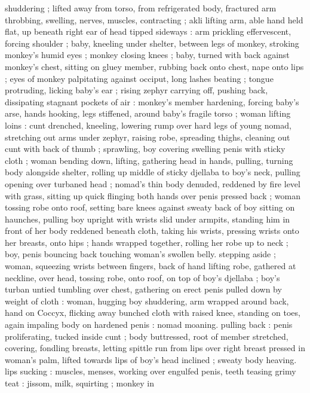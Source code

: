 shuddering ; lifted away from torso, from refrigerated body, fractured 
arm throbbing, swelling, nerves, muscles, contracting ; akli lifting 
arm, able hand held flat, up beneath right ear of head tipped 
sideways : arm prickling effervescent, forcing shoulder ; baby, 
kneeling under shelter, between legs of monkey, stroking monkey's 
humid eyes ; monkey closing knees ; baby, turned with back against 
monkey's chest, sitting on gluey member, rubbing back onto chest, 
nape onto lips ; eyes of monkey palpitating against occiput, long 
lashes beating ; tongue protruding, licking baby's ear ; rising zephyr 
carrying off, pushing back, dissipating stagnant pockets of air : 
monkey's member hardening, forcing baby's arse, hands hooking, 
legs stiffened, around baby's fragile torso ; woman lifting loins : cunt 
drenched, kneeling, lowering rump over hard legs of young nomad, 
stretching out arms under zephyr, raising robe, spreading thighs, 
cleaning out cunt with back of thumb ; sprawling, boy covering 
swelling penis with sticky cloth ; woman bending down, lifting, 
gathering head in hands, pulling, turning body alongside shelter, 
rolling up middle of sticky djellaba to boy's neck, pulling opening 
over turbaned head ; nomad's thin body denuded, reddened by fire 
level with grass, sitting up quick flinging both hands over penis 
pressed back ; woman tossing robe onto roof, setting bare knees 
against sweaty back of boy sitting on haunches, pulling boy upright 
with wrists slid under armpits, standing him in front of her body 
reddened beneath cloth, taking his wrists, pressing wrists onto her 
breasts, onto hips ; hands wrapped together, rolling her robe up to 
neck ; boy, penis bouncing back touching woman's swollen belly. 
stepping aside ; woman, squeezing wrists between fingers, back of 
hand lifting robe, gathered at neckline, over head, tossing robe, onto 
roof, on top of boy's djellaba ; boy's turban untied tumbling over 
chest, gathering on erect penis pulled down by weight of cloth : 
woman, hugging boy shuddering, arm wrapped around back, hand on 
Coccyx, flicking away bunched cloth with raised knee, standing on 
toes, again impaling body on hardened penis : nomad moaning. 
pulling back : penis proliferating, tucked inside cunt ; body 
buttressed, root of member stretched, covering, fondling breasts, 
letting spittle run from lips over right breast pressed in woman's 
palm, lifted towards lips of boy's head inclined ; sweaty body 
heaving. lips sucking : muscles, menses, working over engulfed 
penis, teeth teasing grimy teat : jissom, milk, squirting ; monkey in 
